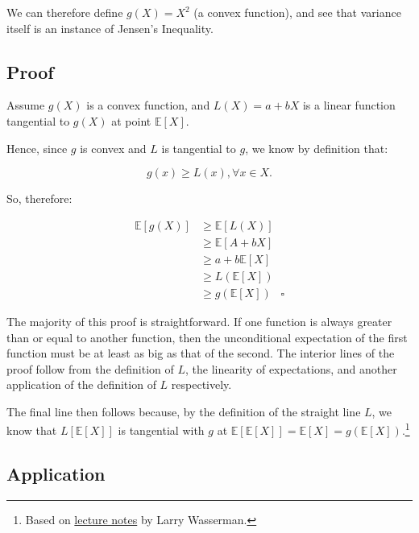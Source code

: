 \documentclass[
]{book}
\begin{document}
We can therefore define \(g(X) = X^2\) (a convex function), and see that variance itself is an instance of Jensen's Inequality.

\hypertarget{proof_ji}{%
\subsection{Proof}\label{proof_ji}}

Assume \(g(X)\) is a convex function, and \(L(X)= a + bX\) is a linear function tangential to \(g(X)\) at point \(\mathbb{E}[X]\).

Hence, since \(g\) is convex and \(L\) is tangential to \(g\), we know by definition that:

\begin{equation}
    g(x) \geq L(x), \forall x \in X.
\end{equation}

So, therefore:

\begin{align}
    \mathbb{E}[g(X)] &\geq \mathbb{E}[L(X)] \\
    &\geq \mathbb{E}[A + bX] \label{eq:def_of_L} \\
    &\geq a +b\mathbb{E}[X] \label{eq:loe}\\ 
    &\geq L(\mathbb{E}[X]) \label{eq:def_of_L2}\\
    &\geq g(\mathbb{E}[X]) \; \; \; \square \label{eq:tang}
\end{align}

The majority of this proof is straightforward. If one function is always greater than or equal to another function, then the unconditional expectation of the first function must be at least as big as that of the second. The interior lines of the proof follow from the definition of \(L\), the linearity of expectations, and another application of the definition of \(L\) respectively.

The final line then follows because, by the definition of the straight line \(L\), we know that \(L[\mathbb{E}[X]]\) is tangential with \(g\) at \(\mathbb{E}[\mathbb{E}[X]] = \mathbb{E}[X] = g(\mathbb{E}[X])\).\footnote{Based on \href{http://www.stat.cmu.edu/~larry/=stat705/Lecture2.pdf}{lecture notes} by Larry Wasserman.}

\hypertarget{application}{%
\subsection{Application}\label{application}}
\end{document}
